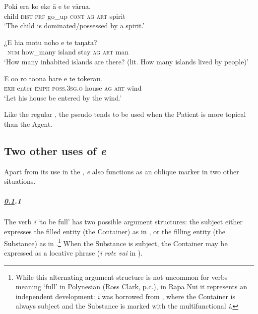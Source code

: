 \ea\label{ex:8.60}
\gll Poki era ko eke {\ꞌ}ā e te vārua.\\
child \textsc{dist} \textsc{prf} go\_up \textsc{cont} \textsc{ag} \textsc{art} spirit\\

\glt 
‘The child is dominated/possessed by a spirit.’ \textstyleExampleref{[R310.268]} 
\z

\ea\label{ex:8.61}
\gll ¿E hia motu noho e te taŋata?\\
~\textsc{num} how\_many island stay \textsc{ag} \textsc{art} man\\

\glt 
‘How many inhabited islands are there? (lit. How many islands lived by people)’ \textstyleExampleref{[R616.132]} 
\z

\ea\label{ex:8.62}
\gll E o{\ꞌ}o rō tō{\ꞌ}ona hare e te tokerau.  \\
\textsc{exh} enter \textsc{emph} \textsc{poss.3sg.o} house \textsc{ag} \textsc{art} wind  \\

\glt
‘Let his house be entered by the wind.’ \textstyleExampleref{[Acts 1:20]}
\z

Like the regular , the pseudo tends to be used when the Patient is more topical than the Agent.

\subsection{Two other uses of \textit{e}}\label{sec:8.5.3}

Apart from its use in the , \textit{e} also functions as an oblique marker in two other situations. 

\subparagraph{\ref{sec:8.5.3}.1} The verb \textit{{\ꞌ}ī} ‘to be full’ has two possible argument structures: the subject either expresses the filled entity (the Container) as in , or the filling entity (the Substance) as in .\footnote{\label{fn:417}While this alternating argument structure is not uncommon for verbs meaning ‘full’ in Polynesian (Ross Clark, p.c.), in Rapa Nui it represents an independent development: \textit{{\ꞌ}ī} was borrowed from , where the Container is always subject and the Substance is marked with the multifunctional  \textit{i}.} When the Substance is subject, the Container may be expressed as a locative phrase (\textit{{\ꞌ}i rote vai} in ).

